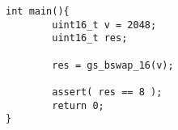\begin{minipage}{14cm}
\begin{lstlisting}[style=CStyle, caption=Example of test case for function \emph{gs\_bswap\_16} derived from CBMC output., label=GSLaugmentationTest]
int main(){
        uint16_t v = 2048;
        uint16_t res;

        res = gs_bswap_16(v);

        assert( res == 8 );
        return 0;
}
\end{lstlisting}
\end{minipage}
